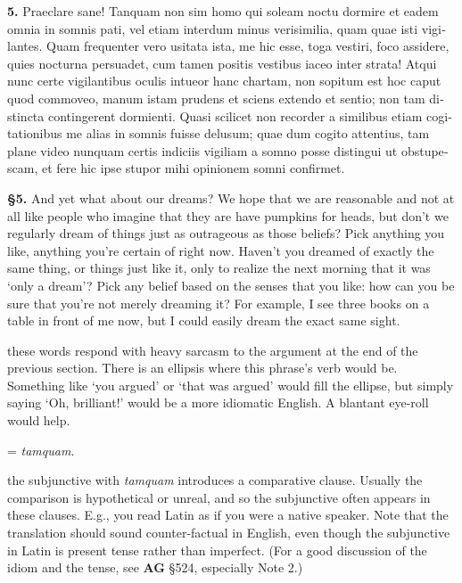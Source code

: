 \beginnumbering
\pstart
\begin{latin}
\textenglish{\textbf{5.}} Praeclare sane! Tanquam non sim homo qui soleam noctu dormire et eadem omnia in somnis pati, vel etiam interdum minus verisimilia, quam quae isti vigilantes. Quam frequenter vero usitata ista, me hic esse, toga vestiri, foco assidere, quies nocturna persuadet, cum tamen positis vestibus iaceo inter strata! Atqui nunc certe vigilantibus oculis intueor hanc chartam, non sopitum est hoc caput quod commoveo, manum istam prudens et sciens extendo et sentio; non tam distincta contingerent dormienti. Quasi scilicet non recorder a similibus etiam cogitationibus me alias in somnis fuisse delusum; quae dum cogito attentius, tam plane video nunquam certis indiciis vigiliam a somno posse distingui ut obstupescam, et fere hic ipse stupor mihi opinionem somni confirmet.
\end{latin}
\pend
\endnumbering

\prenotes

\textbf{§5.} And yet what about our dreams? We hope that we are reasonable and not at all like people who imagine that they are have pumpkins for heads, but don't we regularly dream of things just as outrageous as those beliefs? Pick anything you like, anything you're certain of right now. Haven't you dreamed of exactly the same thing, or things just like it, only to realize the next morning that it was `only a dream'? Pick any belief based on the senses that you like: how can you be sure that you're not merely dreaming it? For example, I see three books on a table in front of me now, but I could easily dream the exact same sight.

 these words respond with heavy sarcasm to the argument at the end of the previous section. There is an ellipsis where this phrase's verb would be. Something like `you argued' or `that was argued' would fill the ellipse, but simply saying `Oh, brilliant!' would be a more idiomatic English. A blantant eye-roll would help.

 = \textit{tamquam}.

 the subjunctive with \textit{tamquam} introduces a comparative clause. Usually the comparison is hypothetical or unreal, and so the subjunctive often appears in these clauses. E.g., you read Latin as if you were a native speaker. Note that the translation should sound counter-factual in English, even though the subjunctive in Latin is present tense rather than imperfect. (For a good discussion of the idiom and the tense, see \textbf{AG} §524, especially Note 2.)

